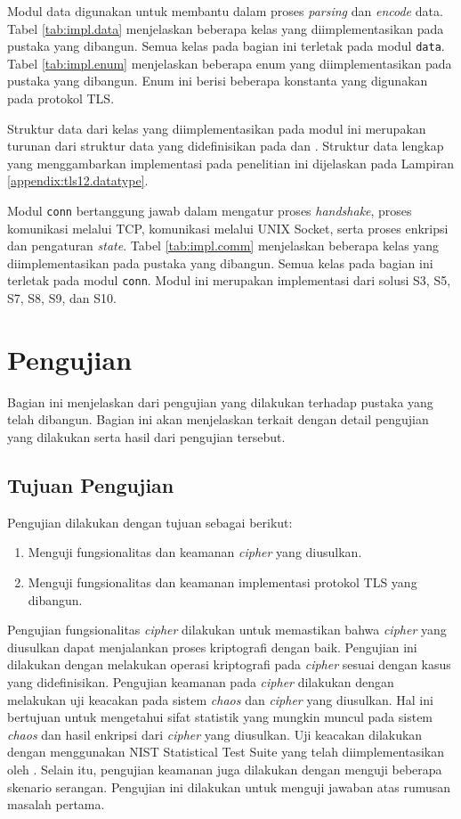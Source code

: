 Modul data digunakan untuk membantu dalam proses \emph{parsing} dan \emph{encode} data. Tabel \ref{tab:impl.data} menjelaskan beberapa kelas yang diimplementasikan pada pustaka yang dibangun. Semua kelas pada bagian ini terletak pada modul \texttt{data}. Tabel \ref{tab:impl.enum} menjelaskan beberapa enum yang diimplementasikan pada pustaka yang dibangun. Enum ini berisi beberapa konstanta yang digunakan pada protokol TLS.

Struktur data dari kelas yang diimplementasikan pada modul ini merupakan turunan dari struktur data yang didefinisikan pada \textcite{rfc5246} dan \textcite{rfc4492}. Struktur data lengkap yang menggambarkan implementasi pada penelitian ini dijelaskan pada Lampiran \ref{appendix:tls12.datatype}.

Modul \texttt{conn} bertanggung jawab dalam mengatur proses \emph{handshake}, proses komunikasi melalui TCP, komunikasi melalui UNIX Socket, serta proses enkripsi dan pengaturan \emph{state}. Tabel \ref{tab:impl.comm} menjelaskan beberapa kelas yang diimplementasikan pada pustaka yang dibangun. Semua kelas pada bagian ini terletak pada modul \texttt{conn}. Modul ini merupakan implementasi dari solusi S3, S5, S7, S8, S9, dan S10.

\section{Pengujian}
Bagian ini menjelaskan dari pengujian yang dilakukan terhadap pustaka yang telah dibangun. Bagian ini akan menjelaskan terkait dengan detail pengujian yang dilakukan serta hasil dari pengujian tersebut.

\subsection{Tujuan Pengujian}
Pengujian dilakukan dengan tujuan sebagai berikut:
\begin{enumerate}
  \item Menguji fungsionalitas dan keamanan \emph{cipher} yang diusulkan.
  \item Menguji fungsionalitas dan keamanan implementasi protokol TLS yang dibangun.
\end{enumerate}

Pengujian fungsionalitas \emph{cipher} dilakukan untuk memastikan bahwa \emph{cipher} yang diusulkan dapat menjalankan proses kriptografi dengan baik. Pengujian ini dilakukan dengan melakukan operasi kriptografi pada \emph{cipher} sesuai dengan kasus yang didefinisikan. Pengujian keamanan pada \emph{cipher} dilakukan dengan melakukan uji keacakan pada sistem \emph{chaos} dan \emph{cipher} yang diusulkan. Hal ini bertujuan untuk mengetahui sifat statistik yang mungkin muncul pada sistem \emph{chaos} dan hasil enkripsi dari \emph{cipher} yang diusulkan. Uji keacakan dilakukan dengan menggunakan NIST Statistical Test Suite yang telah diimplementasikan oleh \textcite{marek2016}. Selain itu, pengujian keamanan juga dilakukan dengan menguji beberapa skenario serangan. Pengujian ini dilakukan untuk menguji jawaban atas rumusan masalah pertama.

